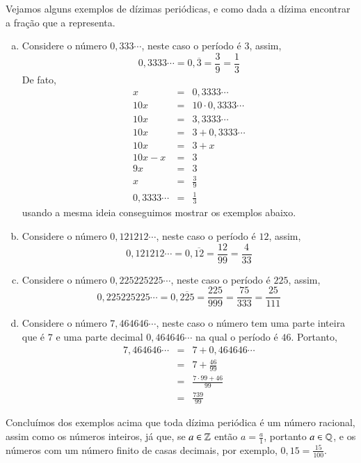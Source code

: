  \begin{exem} Vejamos alguns exemplos de dízimas periódicas, e como dada a dízima encontrar a fração que a representa.

  \begin{enumerate}[a)]
   \item Considere o número $0,333 \cdots$, neste caso o período é $3$, assim,
   \[0,3333 \cdots= 0,\overline{3}= \frac{3}{9}= \frac{1}{3}\]
   De fato,
   \begin{eqnarray*}
    x &=& 0,3333 \cdots \\
    10x &=& 10 \cdot 0,3333 \cdots \\
    10x &=& 3,3333 \cdots \\
    10x &=& 3 + 0,3333 \cdots \\
    10x &=& 3 + x \\
    10x - x &=& 3 \\
    9x &=& 3 \\
    x &=& \frac{3}{9} \\
    0,3333 \cdots &=& \frac{1}{3}
   \end{eqnarray*}
   usando a mesma ideia conseguimos mostrar os exemplos abaixo.

   \item Considere o número $0,121212 \cdots$, neste caso o período é $12$, assim,
   \[0,121212 \cdots= 0,\overline{12}= \frac{12}{99}= \frac{4}{33}\]
   \item Considere o número $0,225225225 \cdots$, neste caso o período é $225$, assim,
   \[0,225225225 \cdots= 0,\overline{225}= \frac{225}{999}= \frac{75}{333}=\frac{25}{111}\]
   \item Considere o número $7,464646 \cdots$, neste caso o número tem uma parte inteira que é $7$ e uma parte decimal $0,464646 \cdots$ na qual o período é $46$. Portanto,
   \begin{eqnarray*}
    7,464646 \cdots &=& 7+0,464646 \cdots \\
    &=& 7 + \frac{46}{99} \\
    &=& \frac{7\cdot 99 + 46}{99}\\
    &=& \frac{739}{99}
   \end{eqnarray*}

  \end{enumerate}

 \end{exem}

Concluímos dos exemplos acima que toda dízima periódica é um número racional, assim como os números inteiros, já que, se $a \in \mathbb{Z}$ então $a=\frac{a}{1}$, portanto $a \in \mathbb{Q}$, e os números com um número finito de casas decimais, por exemplo, $0,15= \frac{15}{100}$.


